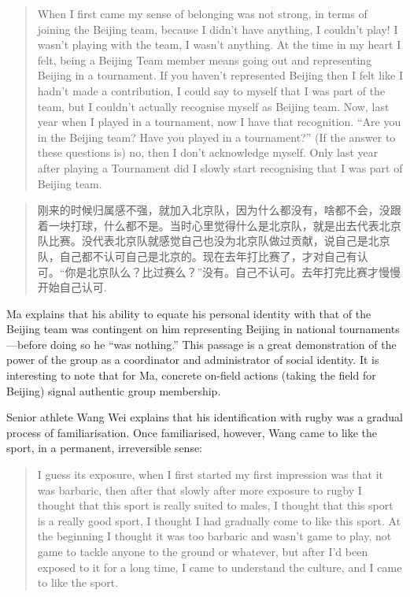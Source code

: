 \begin{CJK}{UTF8}{gbsn}
  \begin{quotation}
    When I first came my sense of belonging was not strong, in terms of joining the Beijing team, because I didn’t have anything, I couldn’t play! I wasn’t playing with the team, I wasn’t anything.  At the time in my heart I felt, being a Beijing Team member means going out and representing Beijing in a tournament.  If you haven’t represented Beijing then I felt like I hadn’t made a contribution, I could say to myself that I was part of the team, but I couldn’t actually recognise myself as Beijing team.  Now, last year when I played in a tournament, now I have that recognition. ``Are you in the Beijing team? Have you played in a tournament?'' (If the answer to these questions is) no, then I don’t acknowledge myself.  Only last year after playing a Tournament did I slowly start recognising that I was part of Beijing team.
  \end{quotation}

  \begin{quotation}
    刚来的时候归属感不强，就加入北京队，因为什么都没有，啥都不会，没跟着一块打球，什么都不是。当时心里觉得什么是北京队，就是出去代表北京队比赛。没代表北京队就感觉自己也没为北京队做过贡献，说自己是北京队，自己都不认可自己是北京的。现在去年打比赛了，才对自己有认可。“你是北京队么？比过赛么？”没有。自己不认可。去年打完比赛才慢慢开始自己认可.
  \end{quotation}

Ma explains that his ability to equate his personal identity with that of the Beijing team was contingent on him representing Beijing in national tournaments---before doing so he ``was nothing.''  This passage is a great demonstration of the power of the group as a coordinator and administrator of social identity.  It is interesting to note that for Ma, concrete on-field actions (taking the field for Beijing) signal authentic group membership.

Senior athlete Wang Wei explains that his identification with rugby was a gradual process of familiarisation. Once familiarised, however, Wang came to like the sport, in a permanent, irreversible sense:

  \begin{quotation}
    I guess its exposure, when I first started my first impression was that it was barbaric, then after that slowly after more exposure to rugby I thought that this sport is really suited to males, I thought that this sport is a really good sport, I thought I had gradually come to like this sport.  At the beginning I thought it was too barbaric and wasn’t game to play, not game to tackle anyone to the ground or whatever, but after I’d been exposed to it for a long time, I came to understand the culture, and I came to like the sport.
  \end{quotation}


\end{CJK}
